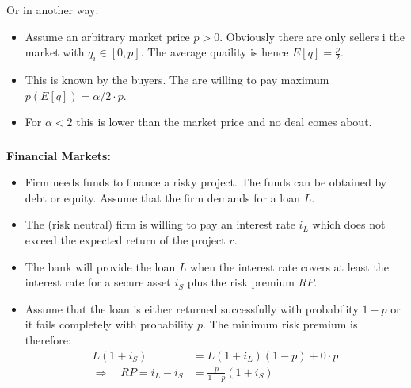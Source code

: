 \documentclass[11pt]{beamer}
\begin{document}

\begin{frame}
\frametitle{\insertsection}

Or in another way:

\begin{itemize}
\item Assume an arbitrary market price  $p>0$. Obviously there are only sellers i the market with $q_i\in[0,p]$.
The average quaility is hence $E[q]=\frac{p}{2}$.

\item This is known by the buyers. The are willing to pay maximum $p(E[q])=\alpha/2\cdot p$.

\item For $\alpha<2$ this is lower than the market price and no deal comes about.
\end{itemize}

\end{frame}


\begin{frame}
\frametitle{\insertsection}

\textbf{Financial Markets:}

\begin{itemize}
\item Firm needs funds to finance a risky project. The funds can be obtained by debt or equity. Assume that the firm demands for a loan $L$.

\item The (risk neutral) firm is willing to pay an interest rate $i_L$ which does not exceed the expected return of the project $r$.

\item The bank will provide the loan $L$ when the interest rate covers at least the interest rate for a secure asset $i_S$ plus the risk premium $RP$.

\item Assume that the loan is either returned successfully with probability $1-p$ or it fails completely with probability $p$. The minimum risk premium is therefore:
\begin{align}
L(1+i_S) &= L(1+i_L)(1-p)+0\cdot p\\
\Rightarrow\quad
RP=i_L-i_S &= \frac{p}{1-p}(1+i_S)
\end{align}

\end{itemize}

\end{frame}
\end{document}
